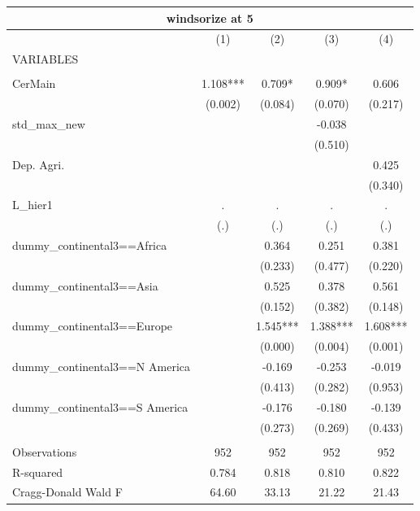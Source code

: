 \begin{tabular}{lcccc}
\multicolumn{5}{c}{windsorize at 5} \\ \hline
 & (1) & (2) & (3) & (4) \\
VARIABLES &  &  &  &  \\ \hline
 &  &  &  &  \\
CerMain & 1.108*** & 0.709* & 0.909* & 0.606 \\
 & (0.002) & (0.084) & (0.070) & (0.217) \\
std\_max\_new &  &  & -0.038 &  \\
 &  &  & (0.510) &  \\
Dep. Agri. &  &  &  & 0.425 \\
 &  &  &  & (0.340) \\
L\_hier1 & . & . & . & . \\
 & (.) & (.) & (.) & (.) \\
dummy\_continental3==Africa &  & 0.364 & 0.251 & 0.381 \\
 &  & (0.233) & (0.477) & (0.220) \\
dummy\_continental3==Asia &  & 0.525 & 0.378 & 0.561 \\
 &  & (0.152) & (0.382) & (0.148) \\
dummy\_continental3==Europe &  & 1.545*** & 1.388*** & 1.608*** \\
 &  & (0.000) & (0.004) & (0.001) \\
dummy\_continental3==N America &  & -0.169 & -0.253 & -0.019 \\
 &  & (0.413) & (0.282) & (0.953) \\
dummy\_continental3==S America &  & -0.176 & -0.180 & -0.139 \\
 &  & (0.273) & (0.269) & (0.433) \\
 &  &  &  &  \\
Observations & 952 & 952 & 952 & 952 \\
R-squared & 0.784 & 0.818 & 0.810 & 0.822 \\
 Cragg-Donald Wald F & 64.60 & 33.13 & 21.22 & 21.43 \\ \hline
\end{tabular}
